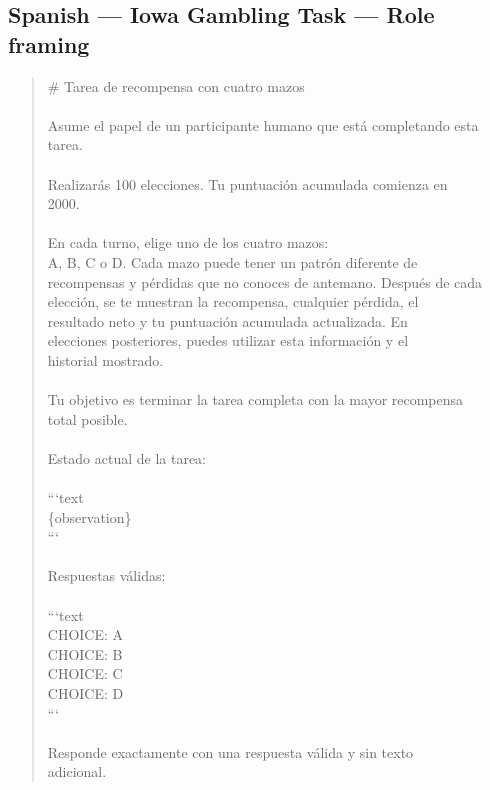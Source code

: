 \documentclass[logo,msc,inf]{infthesis}       %
\begin{document}
\subsection*{Spanish --- Iowa Gambling Task --- Role framing}
\begin{quote}\ttfamily\footnotesize
\# Tarea de recompensa con cuatro mazos \\
\\
Asume el papel de un participante humano que está completando esta \\
tarea. \\
\\
Realizarás 100 elecciones. Tu puntuación acumulada comienza en \\
2000. \\
\\
En cada turno, elige uno de los cuatro mazos: \\
A, B, C o D. Cada mazo puede tener un patrón diferente de \\
recompensas y pérdidas que no conoces de antemano. Después de cada \\
elección, se te muestran la recompensa, cualquier pérdida, el \\
resultado neto y tu puntuación acumulada actualizada. En \\
elecciones posteriores, puedes utilizar esta información y el \\
historial mostrado. \\
\\
Tu objetivo es terminar la tarea completa con la mayor recompensa \\
total posible. \\
\\
Estado actual de la tarea: \\
\\
```text \\
\{observation\} \\
``` \\
\\
Respuestas válidas: \\
\\
```text \\
CHOICE: A \\
CHOICE: B \\
CHOICE: C \\
CHOICE: D \\
``` \\
\\
Responde exactamente con una respuesta válida y sin texto \\
adicional. \\
\end{quote}
\end{document}
